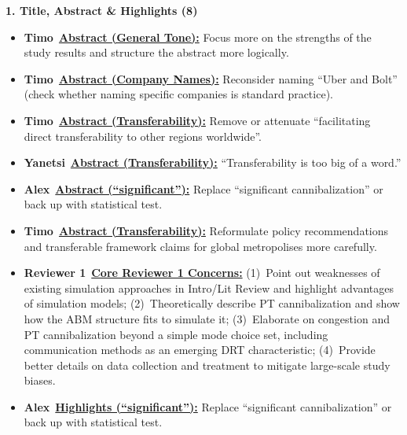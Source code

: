 \documentclass[preprint,12pt,authoryear]{elsarticle}
\newcommand{\todobadge}[2]{\colorbox{#1}{\textbf{\scriptsize #2}}}
\newcommand{\badgeTimo}{\todobadge{orange!30}{Timo}}
\newcommand{\badgeAlex}{\todobadge{blue!25}{Alex}}
\newcommand{\badgeYanetsi}{\todobadge{purple!30}{Yanetsi}}
\newcommand{\badgeRev}{\todobadge{green!35}{Reviewer 1}}
\begin{document}
\vspace{4pt}
\noindent\textbf{1. Title, Abstract \& Highlights (8)}
\begin{itemize}\setlength{\itemsep}{1pt}\setlength{\parskip}{0pt}\setlength{\parsep}{0pt}
  \item[$\square$] \badgeTimo\ \hyperlink{todo:abstract-tone}{\textbf{Abstract (General Tone):}} Focus more on the strengths of the study results and structure the abstract more logically.
  \item[$\square$] \badgeTimo\ \hyperlink{todo:abstract-companies}{\textbf{Abstract (Company Names):}} Reconsider naming ``Uber and Bolt'' (check whether naming specific companies is standard practice).
  \item[$\square$] \badgeTimo\ \hyperlink{todo:abstract-transfer1}{\textbf{Abstract (Transferability):}} Remove or attenuate ``facilitating direct transferability to other regions worldwide''.
  \item[$\square$] \badgeYanetsi\ \hyperlink{todo:abs-yanetsi-transfer}{\textbf{Abstract (Transferability):}} ``Transferability is too big of a word.''
  \item[$\square$] \badgeAlex\ \hyperlink{todo:abs-sig}{\textbf{Abstract (``significant''):}} Replace ``significant cannibalization'' or back up with statistical test.
  \item[$\square$] \badgeTimo\ \hyperlink{todo:abstract-transfer2}{\textbf{Abstract (Transferability):}} Reformulate policy recommendations and transferable framework claims for global metropolises more carefully.
  \item[$\square$] \badgeRev\ \hyperlink{todo:rev1-summary}{\textbf{Core Reviewer 1 Concerns:}} (1)~Point out weaknesses of existing simulation approaches in Intro/Lit Review and highlight advantages of simulation models; (2)~Theoretically describe PT cannibalization and show how the ABM structure fits to simulate it; (3)~Elaborate on congestion and PT cannibalization beyond a simple mode choice set, including communication methods as an emerging DRT characteristic; (4)~Provide better details on data collection and treatment to mitigate large-scale study biases.
  \item[$\square$] \badgeAlex\ \hyperlink{todo:hl-sig}{\textbf{Highlights (``significant''):}} Replace ``significant cannibalization'' or back up with statistical test.
\end{itemize}
\end{document}
